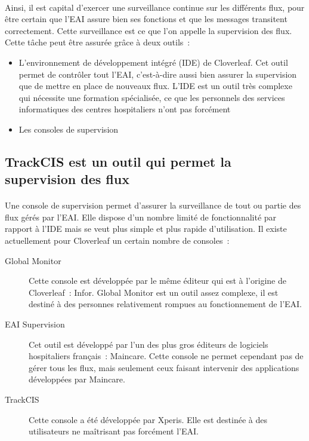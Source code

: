 			\paragraph{}%
			Ainsi, il est capital d'exercer une surveillance continue sur les différents
			flux, pour être certain que l'EAI assure bien ses fonctions et que les
			messages transitent correctement. Cette surveillance est ce que l'on appelle
			la supervision des flux. Cette tâche peut être assurée grâce à deux outils~:
			\begin{itemize}
			  \item L'environnement de développement intégré (IDE) de Cloverleaf. Cet
			  outil permet de contrôler tout l'EAI, c'est-à-dire aussi bien assurer la
			  supervision que de mettre en place de nouveaux flux. L'IDE est un outil
			  très complexe qui nécessite une formation spécialisée, ce que les
			  personnels des services informatiques des centres hospitaliers n'ont pas
			  forcément
			  \item Les consoles de supervision
			\end{itemize}
			
		\subsection{TrackCIS est un outil qui permet la supervision des flux}
			\paragraph{}%
			Une console de supervision permet d'assurer la surveillance
			de tout ou partie des flux gérés par l'EAI. Elle dispose d'un
			nombre limité de fonctionnalité par rapport à l'IDE mais se veut plus simple
			et plus rapide d'utilisation. Il existe actuellement pour Cloverleaf un
			certain nombre de consoles~:
			\begin{description}
				\item[Global Monitor] Cette console est développée par le même éditeur qui
				est à l'origine de Cloverleaf~: Infor. Global Monitor est un outil assez
				complexe, il est destiné à des personnes relativement rompues au
				fonctionnement de l'EAI.
				\item[EAI Supervision] Cet outil est développé par l'un des plus gros
				éditeurs de logiciels hospitaliers français~: Maincare. Cette console ne
				permet cependant pas de gérer tous les flux, mais seulement ceux faisant
				intervenir des applications développées par Maincare.
				\item[TrackCIS] Cette console a été développée par Xperis. Elle est destinée
				à des utilisateurs ne maîtrisant pas forcément l'EAI.
			\end{description}
			
